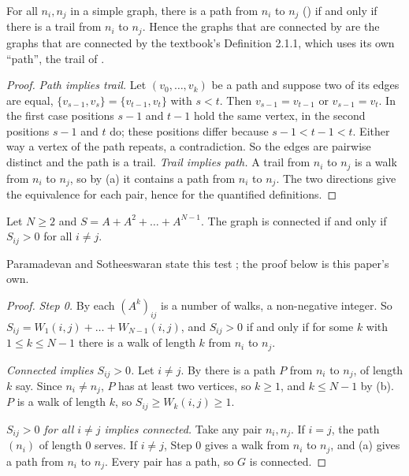 \begin{proposition}\label{prop:same}
For all $n_i, n_j$ in a simple graph, there is a path from $n_i$ to $n_j$ () if and only if there is a trail from $n_i$ to $n_j$. Hence the graphs that are connected by  are the graphs that are connected by the textbook's Definition 2.1.1, which uses its own ``path'', the trail of .
\end{proposition}

\begin{proof}
\emph{Path implies trail.} Let $(v_0, \dots, v_k)$ be a path and suppose two of its edges are equal, $\{v_{s-1}, v_s\} = \{v_{t-1}, v_t\}$ with $s < t$. Then $v_{s-1} = v_{t-1}$ or $v_{s-1} = v_t$. In the first case positions $s-1$ and $t-1$ hold the same vertex, in the second positions $s-1$ and $t$ do; these positions differ because $s - 1 < t - 1 < t$. Either way a vertex of the path repeats, a contradiction. So the edges are pairwise distinct and the path is a trail. \emph{Trail implies path.} A trail from $n_i$ to $n_j$ is a walk from $n_i$ to $n_j$, so by (a) it contains a path from $n_i$ to $n_j$. The two directions give the equivalence for each pair, hence for the quantified definitions.
\end{proof}

\begin{theorem}\label{thm:test}
Let $N \ge 2$ and $S = A + A^2 + \dots + A^{N-1}$. The graph is connected if and only if $S_{ij} > 0$ for all $i \ne j$.
\end{theorem}

Paramadevan and Sotheeswaran state this test \cite[Theorem 2, p.~17]{paramadevan2021adjacency}; the proof below is this paper's own.

\begin{proof}
\emph{Step 0.} By  each $(A^k)_{ij}$ is a number of walks, a non-negative integer. So $S_{ij} = W_1(i,j) + \dots + W_{N-1}(i,j)$, and $S_{ij} > 0$ if and only if for some $k$ with $1 \le k \le N-1$ there is a walk of length $k$ from $n_i$ to $n_j$.

\emph{Connected implies $S_{ij} > 0$.} Let $i \ne j$. By  there is a path $P$ from $n_i$ to $n_j$, of length $k$ say. Since $n_i \ne n_j$, $P$ has at least two vertices, so $k \ge 1$, and $k \le N - 1$ by (b). $P$ is a walk of length $k$, so $S_{ij} \ge W_k(i,j) \ge 1$.

\emph{$S_{ij} > 0$ for all $i \ne j$ implies connected.} Take any pair $n_i, n_j$. If $i = j$, the path $(n_i)$ of length $0$ serves. If $i \ne j$, Step 0 gives a walk from $n_i$ to $n_j$, and (a) gives a path from $n_i$ to $n_j$. Every pair has a path, so $G$ is connected.
\end{proof}


